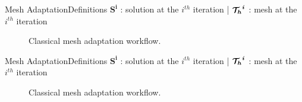 \begin{frame}[noframenumbering]{Mesh Adaptation}{Definitions}
  $\boldsymbol{S^i}$ : solution at the $i^{th}$ iteration |
  $\boldsymbol{{\mathcal{T}_h}^i}$ : mesh at the $i^{th}$ iteration
  \vspace{0.5cm}
   \begin{figure}
        \caption{Classical mesh adaptation workflow.}
   \end{figure}
\end{frame}


\begin{frame}[noframenumbering]{Mesh Adaptation}{Definitions}
  $\boldsymbol{S^i}$ : solution at the $i^{th}$ iteration |
  $\boldsymbol{{\mathcal{T}_h}^i}$ : mesh at the $i^{th}$ iteration
  \vspace{0.5cm}
   \begin{figure}
        \caption{Classical mesh adaptation workflow.}
   \end{figure}
\end{frame}


